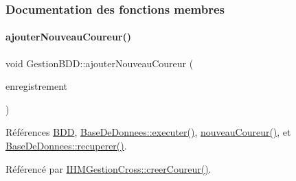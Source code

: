 \subsubsection{Documentation des fonctions membres}
\mbox{\label{class_gestion_b_d_d_ae71561eea6d1163ff067f079ccc6d169}} 
\paragraph{\texorpdfstring{ajouter\+Nouveau\+Coureur()}{ajouterNouveauCoureur()}}
{\footnotesize\ttfamily void Gestion\+B\+D\+D\+::ajouter\+Nouveau\+Coureur (\begin{DoxyParamCaption}\item[{Q\+String\+List}]{enregistrement }\end{DoxyParamCaption})}



Références \hyperlink{class_gestion_b_d_d_a1bd17cbf5754eb6e54ae351f1d02dca2}{B\+DD}, \hyperlink{class_base_de_donnees_aa8de5f8f8bb17edc43f5c0ee33712081}{Base\+De\+Donnees\+::executer()}, \hyperlink{class_gestion_b_d_d_acf915265e83f03b500f10ffbde2680bb}{nouveau\+Coureur()}, et \hyperlink{class_base_de_donnees_a77539baad389f5acf754cd2cd452403e}{Base\+De\+Donnees\+::recuperer()}.



Référencé par \hyperlink{class_i_h_m_gestion_cross_a6000b152ba3febb45d6c409519168ba2}{I\+H\+M\+Gestion\+Cross\+::creer\+Coureur()}.


